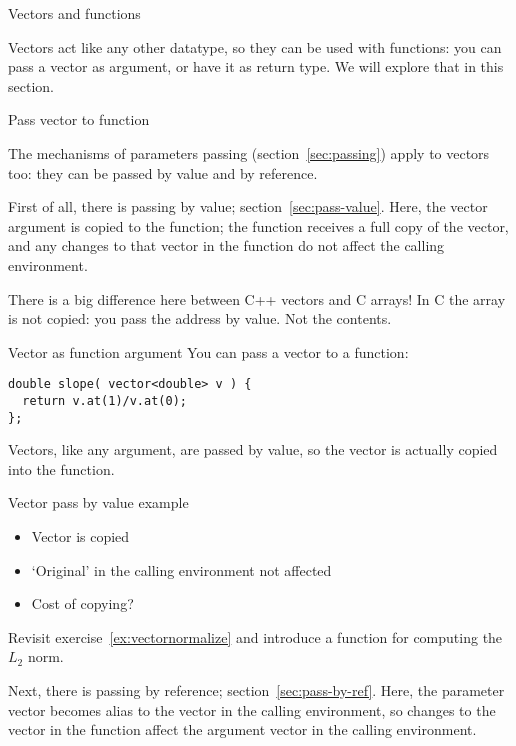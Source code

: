  {Vectors and functions}

Vectors act like any other datatype, so they can be used with functions:
you can pass a vector as argument, or have it as return type.
We will explore that in this section.

 {Pass vector to function}

The mechanisms of parameters passing (section~\ref{sec:passing})
apply to vectors too: they can be passed by value and by reference.

First of all, there is passing by value; section~\ref{sec:pass-value}.
Here, the vector argument is copied to the function;
the function receives a full copy of the vector,
and any changes to that vector in the function
do not affect the calling environment.

\begin{cnote}
  There is a big difference here between C++ vectors and C arrays!
  In C the array is not copied: you pass the address by value. Not the contents.
\end{cnote}

\begin{slide}{Vector as function argument}
  \label{sl:vector-arg}
  You can pass a vector to a function:
\begin{lstlisting}
double slope( vector<double> v ) {
  return v.at(1)/v.at(0);
};
\end{lstlisting}
Vectors, like any argument, are passed by value, so the vector is
actually copied into the function.
\end{slide}

\begin{block}{Vector pass by value example}
  \label{sl:vector-arg-ex}
  \begin{itemize}
  \item Vector is copied
  \item `Original' in the calling environment not affected
  \item Cost of copying?
  \end{itemize}
\end{block}

\begin{exercise}
  \label{ex:vectornormalize-function}
  Revisit exercise~\ref{ex:vectornormalize} and introduce a function
  for computing the $L_2$ norm.
\end{exercise}

Next, there is passing by reference; section~\ref{sec:pass-by-ref}.
Here, the parameter vector becomes alias to the vector in the calling environment,
so changes to the vector in the function affect the argument vector
in the calling environment.

